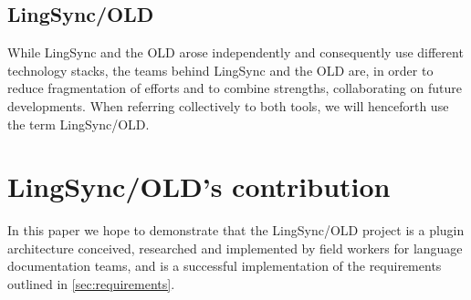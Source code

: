\documentclass[11pt]{article}
\begin{document}
\subsection{LingSync/OLD}

While LingSync and the OLD arose independently and consequently use different
technology stacks, the teams behind LingSync and the OLD are, in order to
reduce fragmentation of efforts and to combine strengths, collaborating on
future developments. When referring collectively to both tools, we will
henceforth use the term LingSync/OLD.

\section{LingSync/OLD's contribution}


%
%


In this paper we hope to demonstrate that the  LingSync/OLD project is a plugin architecture conceived, researched and implemented by field workers for language documentation teams, and is a successful implementation of the requirements outlined in \autoref{sec:requirements}.
\end{document}
